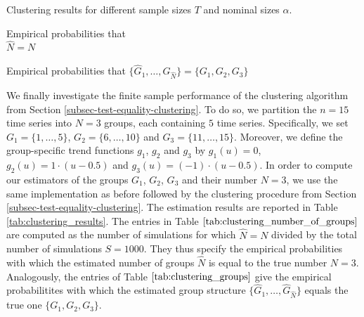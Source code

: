 \addtocounter{table}{-1} 
\begin{table}[t]
\footnotesize{
\begin{center}
\caption{Clustering results for different sample sizes $T$ and nominal sizes $\alpha$.}\label{tab:clustering_results}
\begin{subtable}[b]{0.48\textwidth}
\centering
\caption{Empirical probabilities that \\ $\widehat{N} = N$}\label{tab:clustering_number_of_groups}
\renewcommand{\arraystretch}{1.2}

\end{subtable}
\begin{subtable}[b]{0.48\textwidth}
\centering
\caption{\centering Empirical probabilities that $\{ \widehat{G}_1,\ldots,\widehat{G}_{\widehat{N}}\} = \{ G_1,G_2,G_3\}$}\label{tab:clustering_groups}
\renewcommand{\arraystretch}{1.2}

\end{subtable}
\end{center}}
\end{table}


We finally investigate the finite sample performance of the clustering algorithm from Section \ref{subsec-test-equality-clustering}. To do so, we partition the $n = 15$ time series into $N=3$ groups, each containing $5$ time series. Specifically, we set $G_1 = \{1,\ldots,5\}$, $G_2 = \{6,\ldots,10\}$ and $G_3 =  \{11,\ldots,15\}$. Moreover, we define the group-specific trend functions $g_1$, $g_2$ and $g_3$ by $g_1(u) = 0$, $g_2(u) = 1 \cdot (u - 0.5)$ and $g_3(u) =  (- 1) \cdot (u - 0.5)$. In order to compute our estimators of the groups $G_1$, $G_2$, $G_3$ and their number $N = 3$, we use the same implementation as before followed by the clustering procedure from Section \ref{subsec-test-equality-clustering}. The estimation results are reported in Table \ref{tab:clustering_results}. The entries in Table $\ref{tab:clustering_number_of_groups}$ are computed as the number of simulations for which $\widehat{N} = N$ divided by the total number of simulations $S = 1000$. They thus specify the empirical probabilities with which the estimated number of groups $\widehat{N}$ is equal to the true number $N = 3$. Analogously, the entries of Table $\ref{tab:clustering_groups}$ give the empirical probabilitites with which the estimated group structure $\{ \widehat{G}_1,\ldots,\widehat{G}_{\widehat{N}}\}$ equals the true one $\{G_1,G_2,G_3\}$. 


